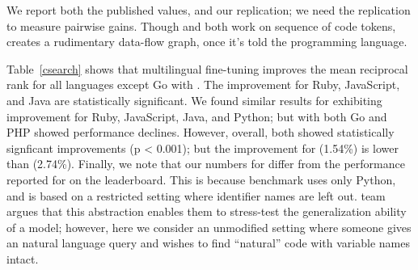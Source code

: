 We report both the published values, and our replication; we need the replication to measure pairwise  gains. 
Though \cbert and \gcbert both work on sequence of code tokens, \gcbert creates a rudimentary data-flow graph, once it's told the programming language. 

Table~\ref{csearch} shows that multilingual fine-tuning improves the mean reciprocal rank for all languages except Go with \cbert. The improvement for Ruby, JavaScript, and Java are statistically significant. We found similar results for \gcbert exhibiting improvement for Ruby, JavaScript, Java, and Python; but with \gcbert both Go and PHP showed performance declines. 
However, overall, both showed statistically signficant improvements (p < 0.001); but the 
 improvement for \gcbert(1.54\%) is lower than \cbert(2.74\%). 
Finally, we note that our numbers for \cbert differ from the performance reported for  on the \cxglue leaderboard. 
This is because \cxglue benchmark uses only Python, and is based on
a restricted setting where identifier names are left out. \cxglue team argues that this abstraction enables them to stress-test the generalization ability of a model; however,
here we consider an unmodified setting where someone gives an natural language query and wishes to find
``natural'' code with variable names intact. 




